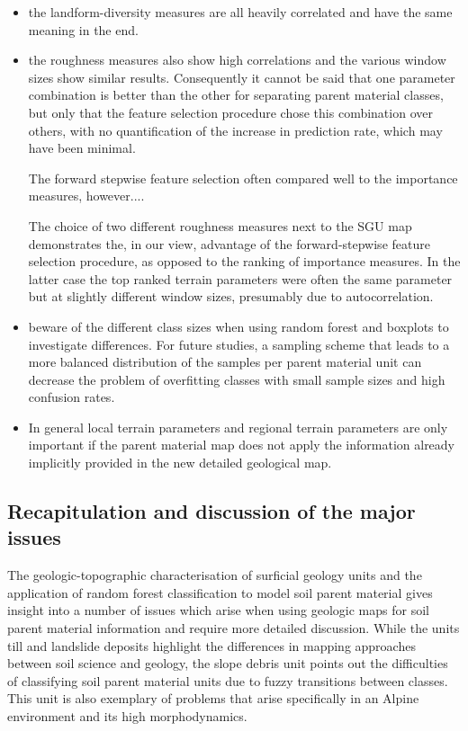 \documentclass[preprint,12pt,authoryear]{elsarticle}
\begin{document}
\begin{itemize}
\item the landform-diversity measures are all heavily correlated and have the same meaning in the end.
\item the roughness measures also show high correlations and the various window sizes show similar results. Consequently it cannot be said that one parameter combination is better than the other for separating parent material classes, but only that the feature selection procedure chose this combination over others, with no quantification of the increase in prediction rate, which may have been minimal.


The forward stepwise feature selection often compared well to the importance measures, however....

The choice of two different roughness measures next to the SGU  map demonstrates the, in our view, advantage of the forward-stepwise feature selection procedure, as opposed to the ranking of importance measures. In the latter case the top ranked terrain parameters were often the same parameter but at slightly different window sizes, presumably due to autocorrelation.
\item beware of the different class sizes when using random forest and boxplots to investigate differences. For future studies, a sampling scheme that leads to a more balanced distribution of the samples per parent material unit can decrease the problem of overfitting classes with small sample sizes and high confusion rates.
\item In general local terrain parameters and regional terrain parameters are only important if the parent material map does not apply the information already implicitly provided in the new detailed geological map.
\end{itemize}

\subsection{Recapitulation and discussion of the major issues}
The geologic-topographic characterisation of surficial geology units and the application of random forest classification to model soil parent material gives insight into a number of issues which arise when using geologic maps for soil parent material information and require more detailed discussion. While the units till and landslide deposits highlight the differences in mapping approaches between soil science and geology, the slope debris unit points out the difficulties of classifying soil parent material units due to fuzzy transitions between classes. This unit is also exemplary of problems that arise specifically in an Alpine environment and its high morphodynamics.  
\end{document}
